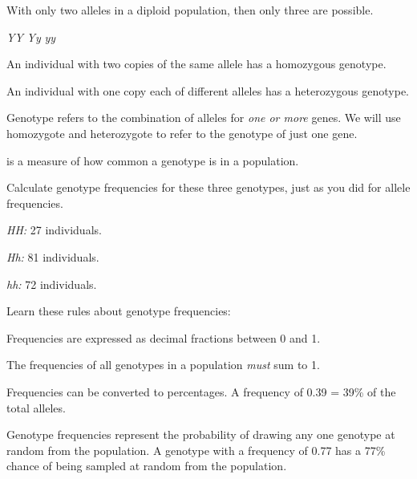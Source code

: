 \documentclass[t]{beamer}
\begin{document}
%
\begin{frame}[t]{With only two alleles in a diploid population, then only three  are possible.}

\Large
\hfil \alert<2>{\emph{YY}} \hfil \alert<3>{\emph{Yy}} \hfil \alert<2>{\emph{yy}} \hfill

\normalsize
	\hangpara {}An individual with two copies of the same allele has a \alert<2>{homozygous} genotype.
	
	\hangpara {}An individual with one copy each of different alleles has a \alert<3>{heterozygous} genotype.
	
	\hangpara {}\textsc{} Genotype refers to the combination of alleles for \emph{one or more} genes. We will use homozygote and heterozygote to refer to the genotype of just one gene.

\end{frame}
%
\begin{frame}[t]{ is a measure of how common a genotype is in a population.}

	\hangpara Calculate genotype frequencies for these three genotypes, just as you did for allele frequencies.
	
	\hangpara \quad \emph{HH:} 27 individuals. \onslide<2>{0.15}
	
	\hangpara \quad	\emph{Hh:} 81 individuals. \onslide<2>{0.45}
	
	\hangpara \quad \emph{hh:} 72 individuals. \onslide<2>{0.40}

\end{frame}
%
\begin{frame}[t]{Learn these rules about genotype frequencies:}

	\hangpara Frequencies are expressed as decimal fractions between 0 and 1.
	
	\hangpara The frequencies of all genotypes in a population \emph{must} sum to 1.
	
	\hangpara Frequencies can be converted to percentages. A frequency of 0.39 = 39\% of the total alleles.
	
	\hangpara Genotype frequencies represent the probability of drawing any one genotype at random from the population. A genotype with a frequency of 0.77 has a 77\% chance of being sampled at random from the population.

\end{frame}
%
\end{document}
